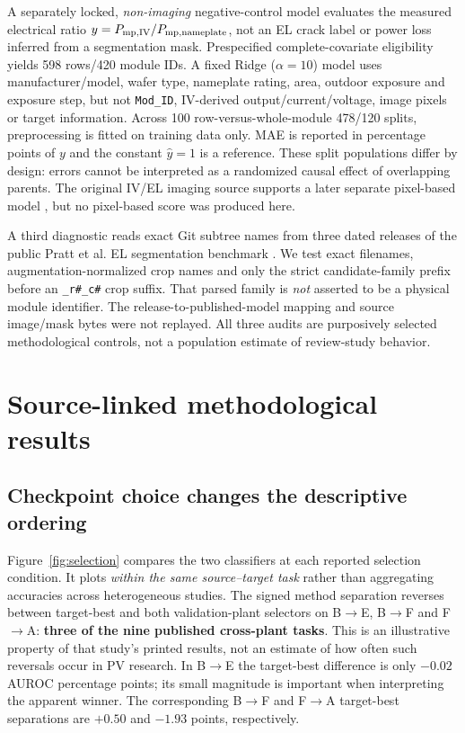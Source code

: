 \documentclass[10pt,a4paper]{article}
\begin{document}
A separately locked, \emph{non-imaging} negative-control model evaluates the measured electrical ratio $y=P_{\rm mp,IV}/P_{\rm mp,nameplate}$, not an EL crack label or power loss inferred from a segmentation mask. Prespecified complete-covariate eligibility yields 598 rows/420 module IDs. A fixed Ridge ($\alpha=10$) model uses manufacturer/model, wafer type, nameplate rating, area, outdoor exposure and exposure step, but not \texttt{Mod\_ID}, IV-derived output/current/voltage, image pixels or target information. Across 100 row-versus-whole-module 478/120 splits, preprocessing is fitted on training data only. MAE is reported in percentage points of $y$ and the constant $\hat y=1$ is a reference. These split populations differ by design: errors cannot be interpreted as a randomized causal effect of overlapping parents. The original IV/EL imaging source supports a later separate pixel-based model \cite{byford2025}, but no pixel-based score was produced here.

A third diagnostic reads exact Git subtree names from three dated releases of the public Pratt et al. EL segmentation benchmark \cite{pratt2023}. We test exact filenames, augmentation-normalized crop names and only the strict candidate-family prefix before an \texttt{\_r\#\_c\#} crop suffix. That parsed family is \emph{not} asserted to be a physical module identifier. The release-to-published-model mapping and source image/mask bytes were not replayed. All three audits are purposively selected methodological controls, not a population estimate of review-study behavior.

\section{Source-linked methodological results}
\subsection{Checkpoint choice changes the descriptive ordering}
Figure~\ref{fig:selection} compares the two classifiers at each reported selection condition. It plots \emph{within the same source--target task} rather than aggregating accuracies across heterogeneous studies. The signed method separation reverses between target-best and both validation-plant selectors on B$\rightarrow$E, B$\rightarrow$F and F$\rightarrow$A: \textbf{three of the nine published cross-plant tasks}. This is an illustrative property of that study's printed results, not an estimate of how often such reversals occur in PV research. In B$\rightarrow$E the target-best difference is only $-0.02$ AUROC percentage points; its small magnitude is important when interpreting the apparent winner. The corresponding B$\rightarrow$F and F$\rightarrow$A target-best separations are $+0.50$ and $-1.93$ points, respectively.
\end{document}
